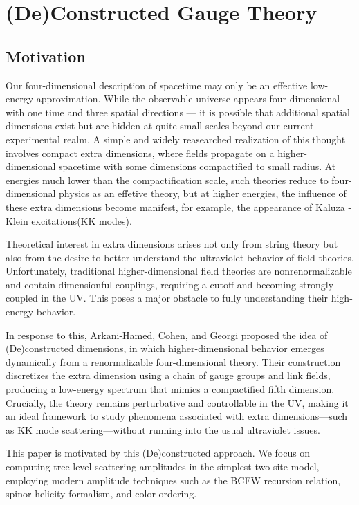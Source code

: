 \documentclass[12pt]{article}
\numberwithin{equation}{section}
\begin{document}
\section{(De)Constructed Gauge Theory}
\subsection{Motivation}
Our four-dimensional description of spacetime may only be an effective low-energy approximation. While the observable universe appears four-dimensional — with one time and three spatial directions — it is possible that additional spatial dimensions exist but are hidden at quite small scales beyond our current experimental realm. A simple and widely reasearched realization of this thought involves compact extra dimensions, where fields propagate on a higher-dimensional spacetime with some dimensions compactified to small radius. At energies much lower than the compactification scale, such theories reduce to four-dimensional physics as an effetive theory, but at higher energies, the influence of these extra dimensions become manifest, for example, the appearance of Kaluza - Klein excitations(KK modes).

Theoretical interest in extra dimensions arises not only from string theory but also from the desire to better understand the ultraviolet behavior of field theories. Unfortunately, traditional higher-dimensional field theories are nonrenormalizable and contain dimensionful couplings, requiring a cutoff and becoming strongly coupled in the UV. This poses a major obstacle to fully understanding their high-energy behavior.

In response to this, Arkani-Hamed, Cohen, and Georgi proposed the idea of (De)constructed dimensions, in which higher-dimensional behavior emerges dynamically from a renormalizable four-dimensional theory. Their construction discretizes the extra dimension using a chain of gauge groups and link fields, producing a low-energy spectrum that mimics a compactified fifth dimension. Crucially, the theory remains perturbative and controllable in the UV, making it an ideal framework to study phenomena associated with extra dimensions—such as KK mode scattering—without running into the usual ultraviolet issues.

This paper is motivated by this (De)constructed approach. We focus on computing tree-level scattering amplitudes in the simplest two-site model, employing modern amplitude techniques such as the BCFW recursion relation, spinor-helicity formalism, and color ordering.
\end{document}
